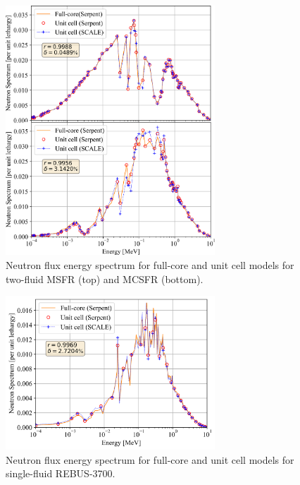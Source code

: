 \documentclass[letterpaper]{mandc2019}
\begin{document}
\begin{figure}[!htb]
  \centering
  \includegraphics[width=0.7\textwidth]{./Figures/two_full_vs_unit_spectrum.png}
  \caption{Neutron flux energy spectrum for full-core and unit cell models for two-fluid \gls{MSFR} (top) and \gls{MCSFR} (bottom).}
  \label{fig:spectrum_two}
    \vspace{-0.5in}
\end{figure}
\begin{figure}[!htb]
  \centering
  \includegraphics[width=0.7\textwidth]{./Figures/rebus_full_vs_unit_spectrum.png}
  \caption{Neutron flux energy spectrum for full-core and unit cell models for single-fluid REBUS-3700.}
  \label{fig:spectrum_rebus}
    \vspace{-0.5in}
\end{figure}
\end{document}
